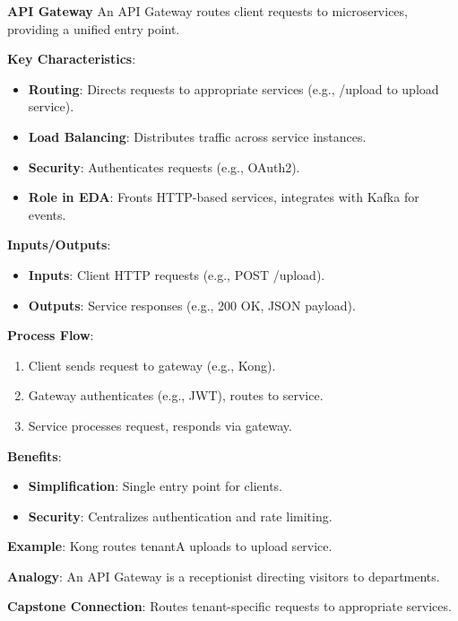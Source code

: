 \documentclass[11pt]{article}
\begin{document}
\begin{glossaryterm}
\textbf{API Gateway}\newline
An API Gateway routes client requests to microservices, providing a unified entry point.

\textbf{Key Characteristics}:
\begin{itemize}
    \item \textbf{Routing}: Directs requests to appropriate services (e.g., /upload to upload service).
    \item \textbf{Load Balancing}: Distributes traffic across service instances.
    \item \textbf{Security}: Authenticates requests (e.g., OAuth2).
    \item \textbf{Role in EDA}: Fronts HTTP-based services, integrates with Kafka for events.
\end{itemize}

\textbf{Inputs/Outputs}:
\begin{itemize}
    \item \textbf{Inputs}: Client HTTP requests (e.g., POST /upload).
    \item \textbf{Outputs}: Service responses (e.g., 200 OK, JSON payload).
\end{itemize}

\textbf{Process Flow}:
\begin{enumerate}
    \item Client sends request to gateway (e.g., Kong).
    \item Gateway authenticates (e.g., JWT), routes to service.
    \item Service processes request, responds via gateway.
\end{enumerate}

\textbf{Benefits}:
\begin{itemize}
    \item \textbf{Simplification}: Single entry point for clients.
    \item \textbf{Security}: Centralizes authentication and rate limiting.
\end{itemize}

\textbf{Example}: Kong routes tenantA uploads to upload service.

\textbf{Analogy}: An API Gateway is a receptionist directing visitors to departments.

\textbf{Capstone Connection}: Routes tenant-specific requests to appropriate services.
\end{glossaryterm}
\end{document}
